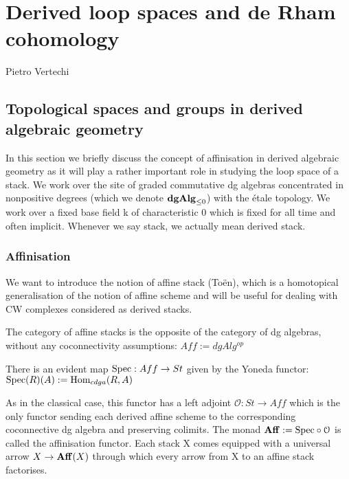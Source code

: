 \chapter{Derived loop spaces and de Rham cohomology}
\label{chapter:derived-loop}
\begin{flushright}
  Pietro Vertechi
\end{flushright}

\begin{refsection}

\section{Topological spaces and groups in derived algebraic geometry}
\label{topology}
In this section we briefly discuss the concept of affinisation in
derived algebraic geometry as it will play a rather important role in studying the loop space of a stack. We work over the site of graded commutative dg algebras
concentrated in nonpositive degrees (which we denote $\mathbf{dgAlg}_{\leq 0}$) with the \'etale topology. We work
over a fixed base field k of characteristic 0 which is fixed for all time and often implicit. Whenever we say stack, we actually mean derived stack.
\subsection{Affinisation}

We want to introduce the notion of affine stack (To\"en), which is a homotopical generalisation of the notion of affine scheme and will be useful for dealing
with CW complexes considered as derived stacks.
\begin{definition}
The category of affine stacks is the opposite of the category of dg algebras, without any coconnectivity assumptions: $Aff:=dgAlg^{op}$
\end{definition}

\begin{remark}
There is an evident map $\mathrm{Spec}: Aff \to St $ given by the Yoneda functor: $\mathrm{Spec}(R)(A):=\mathrm{Hom}_{cdga}(R,A)$
\end{remark}

As in the classical case, this functor has a left adjoint $\mathcal{O}: St \to Aff$ which is the only functor sending each derived affine scheme to the corresponding coconnective
dg algebra and preserving colimits.
The monad $\mathbf{Aff}:= \mathrm{Spec}\circ\mathcal{O}$ is called the affinisation functor. Each stack X comes equipped with a universal arrow $X\to\mathbf{Aff}(X)$ through which every arrow
from X to an affine stack factorises.\\


\end{refsection}

